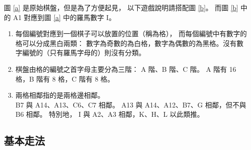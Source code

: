 \documentclass[11pt,a4paper]{article}
\begin{document}
圖 \ref{a} 是原始棋盤，但是為了方便起見，
以下遊戲說明請搭配圖 \ref{b}。
而圖 \ref{b} 中的 A1 對應到圖 \ref{a} 中的羅馬數字 I。
\begin{enumerate}
	\item
		每個編號對應到一個棋子可以放置的位置（稱為格），
		而每個編號中有數字的格可以分成黑白兩類：
		數字為奇數的為白格，數字為偶數的為黑格。沒有數字編號的（只有羅馬字母的）則沒有分類。
	\item
		棋盤由格的編號之首字母主要分為三階： A 階、B 階、C 階。
		A 階有 16 格，B 階有 8 格，C 階有 8 格。
	\item
		兩格相鄰指的是兩格邊相鄰。\\
		\zB B7 與 A14、A13、C6、C7 相鄰。
		A13 與 A14、A12、B7、G 相鄰，但不與 B6 相鄰。
		特別地， I 與 A2、A3 相鄰，K、H、L 以此類推。
\end{enumerate}

\subsection{基本走法} \label{moving} %
\end{document}
